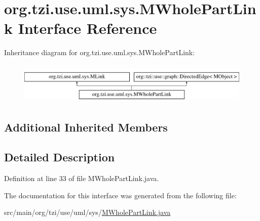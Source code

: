 \hypertarget{interfaceorg_1_1tzi_1_1use_1_1uml_1_1sys_1_1_m_whole_part_link}{\section{org.\-tzi.\-use.\-uml.\-sys.\-M\-Whole\-Part\-Link Interface Reference}
\label{interfaceorg_1_1tzi_1_1use_1_1uml_1_1sys_1_1_m_whole_part_link}
}
Inheritance diagram for org.\-tzi.\-use.\-uml.\-sys.\-M\-Whole\-Part\-Link\-:\begin{figure}[H]
\begin{center}
\leavevmode
\includegraphics[height=2.000000cm]{interfaceorg_1_1tzi_1_1use_1_1uml_1_1sys_1_1_m_whole_part_link}
\end{center}
\end{figure}
\subsection*{Additional Inherited Members}


\subsection{Detailed Description}


Definition at line 33 of file M\-Whole\-Part\-Link.\-java.



The documentation for this interface was generated from the following file\-:\begin{DoxyCompactItemize}
\item 
src/main/org/tzi/use/uml/sys/\hyperlink{_m_whole_part_link_8java}{M\-Whole\-Part\-Link.\-java}\end{DoxyCompactItemize}
